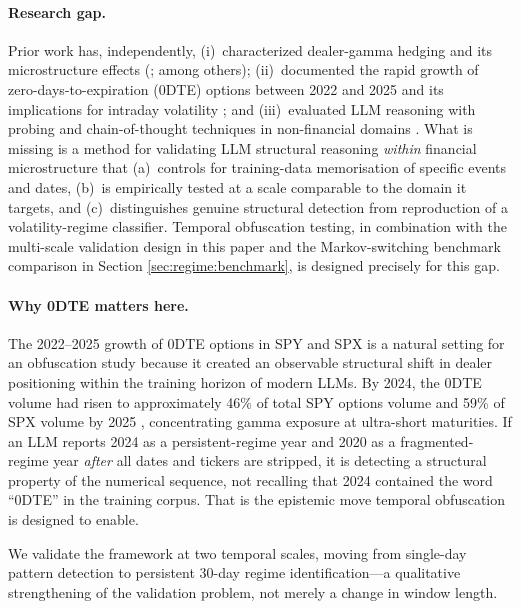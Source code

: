 \documentclass[jrfm,article,accept,moreauthors,pdftex]{Definitions/mdpi}
\begin{document}
\paragraph{{Research gap.}}%
Prior work has, independently, (i)~characterized dealer-gamma hedging and its microstructure effects (\citealp{ni2005stock,garleanu2009demand,anderegg2022impact,dim2023odtes,adams2025zerodte}; among others); (ii)~documented the rapid growth of zero-days-to-expiration (0DTE) options between 2022 and 2025 and its implications for intraday volatility \citep{cboe2024zero,cboe2025spx0dte,fishman2023gamma}; and (iii)~evaluated LLM reasoning with probing and chain-of-thought techniques in non-financial domains \citep{wei2022chain,kojima2022large,mccoy2023embers}. What is missing is a method for validating LLM structural reasoning \emph{within} financial microstructure that (a)~controls for training-data memorisation of specific events and dates, (b)~is empirically tested at a scale comparable to the domain it targets, and (c)~distinguishes genuine structural detection from reproduction of a volatility-regime classifier. Temporal obfuscation testing, in combination with the multi-scale validation design in this paper and the Markov-switching benchmark comparison in {Section} %
 \ref{sec:regime:benchmark}, is designed precisely for this gap.

\paragraph{{Why 0DTE matters here.}}
The 2022--2025 growth of 0DTE options in SPY and SPX is a natural setting for an obfuscation study because it created an observable structural shift in dealer positioning within the training horizon of modern LLMs. By 2024, the 0DTE volume had risen to approximately 46\% of total SPY options volume and 59\% of SPX volume by 2025 \citep{cboe2024zero,cboe2025spx0dte,dim2023odtes,adams2025zerodte}, concentrating gamma exposure at ultra-short maturities. If an LLM reports 2024 as a persistent-regime year and 2020 as a fragmented-regime year \emph{after} all dates and tickers are stripped, it is detecting a structural property of the numerical sequence, not recalling that 2024 contained the word ``0DTE'' in the training corpus. That is the epistemic move temporal obfuscation is designed to enable.

We validate the framework at two temporal scales, moving from single-day pattern detection to persistent 30-day regime identification---a qualitative strengthening of the validation problem, not merely a change in window length.
\end{document}
